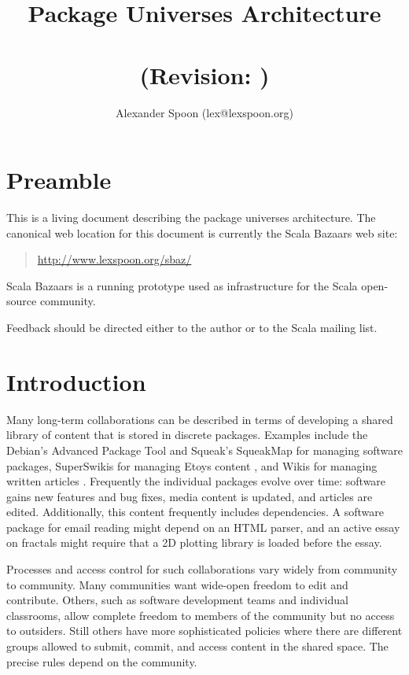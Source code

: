 \documentclass{article}
\begin{document}

\title{Package Universes Architecture\\
       {\svndate} \\
       (Revision: \svnversion)}
\author{Alexander Spoon (lex@lexspoon.org)}
\date{}
\maketitle

\section{Preamble}
This is a living document describing the package universes
architecture.  
The canonical web location for this document is currently the Scala
Bazaars web site:
\begin{quote}
  \url{http://www.lexspoon.org/sbaz/}
\end{quote}
Scala Bazaars is a running prototype used as infrastructure for the
Scala \cite{scala:spec, scala:web} open-source community.

Feedback should be directed either to the author or to the Scala
mailing list.


\section{Introduction}
Many long-term collaborations can be described in terms of developing
a shared library of content that is stored in discrete packages.  
Examples include the Debian's Advanced Package Tool \cite{apt:howto} and
Squeak's SqueakMap for managing software packages, SuperSwikis for
managing Etoys content \cite{steinmetz02:learning}, and Wikis for
managing written articles \cite{ward01:wikiway}.  Frequently the
individual packages evolve over time: software gains new features and
bug fixes, media content is updated, and articles are edited.
Additionally, this content frequently includes dependencies.  A
software package for email reading might depend on an HTML
parser, and an active essay on fractals might require that
a 2D plotting library is loaded before the essay.

Processes and access control for such collaborations vary widely from
community to community.  Many communities want wide-open freedom to edit
and contribute.  Others, such as software development teams and
individual classrooms, allow complete freedom to members of the
community but no access to outsiders.  Still others have more
sophisticated policies where there are different groups allowed to
submit, commit, and access content in the shared space.  The precise
rules depend on the community.
\end{document}
